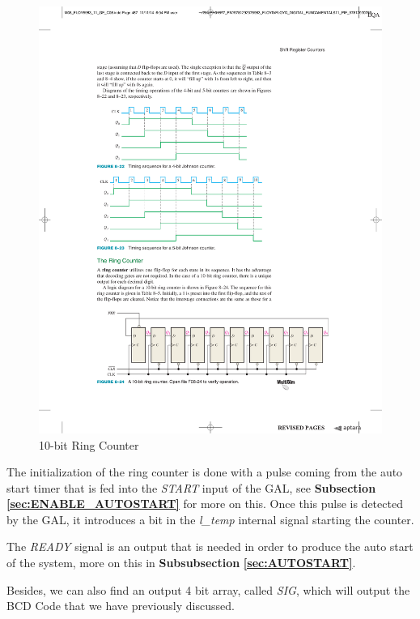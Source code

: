 \begin{figure}[H]
    \centering
    \includegraphics[scale = 0.75]{Graphics/KEYPAD/RING_COUNTER.pdf}
    \caption{10-bit Ring Counter ~\autocite{FLOYD}}
    \label{fig:KEYPAD_RING}
\end{figure}

\medskip
The initialization of the ring counter is done with a pulse coming from the auto start timer that is fed into the \emph{START} input of the GAL, see \textbf{Subsection} \textbf{\ref{sec:ENABLE_AUTOSTART}} for more on this. Once this pulse is detected by the GAL, it introduces a bit in the \emph{l\_temp} internal signal starting the counter. 

\medskip
The \emph{READY} signal is an output that is needed in order to produce the auto start of the system, more on this in \textbf{Subsubsection} \textbf{\ref{sec:AUTOSTART}}.\medskip

Besides, we can also find an output 4 bit array, called \emph{SIG}, which will output the BCD Code that we have previously discussed.\medskip


